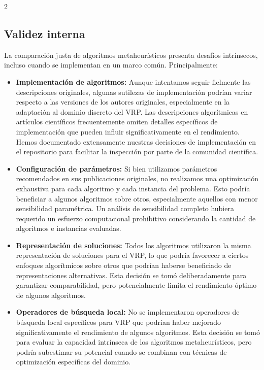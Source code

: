 \documentclass[10pt,a4paper]{extarticle}
\begin{document}
{\begin{multicols}{2}
\subsection{Validez interna}
La comparación justa de algoritmos metaheurísticos presenta desafíos intrínsecos, incluso cuando se implementan en un marco común. Principalmente:
\begin{itemize}
\item \textbf{Implementación de algoritmos:} Aunque intentamos seguir fielmente las descripciones originales, algunas sutilezas de implementación podrían variar respecto a las versiones de los autores originales, especialmente en la adaptación al dominio discreto del VRP. Las descripciones algorítmicas en artículos científicos frecuentemente omiten detalles específicos de implementación que pueden influir significativamente en el rendimiento. Hemos documentado extensamente nuestras decisiones de implementación en el repositorio para facilitar la inspección por parte de la comunidad científica.
\item \textbf{Configuración de parámetros:} Si bien utilizamos parámetros recomendados en sus publicaciones originales, no realizamos una optimización exhaustiva para cada algoritmo y cada instancia del problema. Esto podría beneficiar a algunos algoritmos sobre otros, especialmente aquellos con menor sensibilidad paramétrica. Un análisis de sensibilidad completo hubiera requerido un esfuerzo computacional prohibitivo considerando la cantidad de algoritmos e instancias evaluadas.
\item \textbf{Representación de soluciones:} Todos los algoritmos utilizaron la misma representación de soluciones para el VRP, lo que podría favorecer a ciertos enfoques algorítmicos sobre otros que podrían haberse beneficiado de representaciones alternativas. Esta decisión se tomó deliberadamente para garantizar comparabilidad, pero potencialmente limita el rendimiento óptimo de algunos algoritmos.
\item \textbf{Operadores de búsqueda local:} No se implementaron operadores de búsqueda local específicos para VRP que podrían haber mejorado significativamente el rendimiento de algunos algoritmos. Esta decisión se tomó para evaluar la capacidad intrínseca de los algoritmos metaheurísticos, pero podría subestimar su potencial cuando se combinan con técnicas de optimización específicas del dominio.
\end{itemize}


\end{multicols}}
\end{document}
